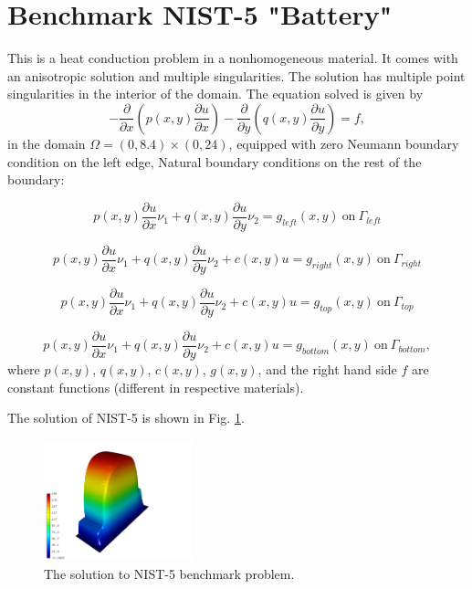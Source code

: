 \section{Benchmark NIST-5 "Battery"}
\label{sec:bench-5}

This is a heat conduction problem in a nonhomogeneous material. It comes with an anisotropic solution and
multiple singularities. The solution has multiple point singularities in the interior of the domain.
The equation solved is given by
\begin{equation} \label{heat-conduction}
-\frac{\partial }{\partial x}\left(p(x, y)\frac{\partial u}{\partial x}\right)
-\frac{\partial }{\partial y}\left(q(x, y)\frac{\partial u}{\partial y}\right) = f,
\end{equation}
in the domain $\Omega = (0, 8.4) \times (0, 24)$, equipped with zero Neumann boundary condition on the left edge, Natural boundary conditions on the rest of the boundary:

\begin{equation}
p(x, y)\frac{\partial u}{\partial x}\nu_1 + q(x, y)\frac{\partial u}{\partial y}\nu_2 = g_{left}(x, y) \ \mbox{on} \  \Gamma_{left}
\end{equation}

\begin{equation}
p(x, y)\frac{\partial u}{\partial x}\nu_1 + q(x, y)\frac{\partial u}{\partial y}\nu_2 + c(x, y)u = g_{right}(x, y) \ \mbox{on} \ \Gamma_{right}
\end{equation}

\begin{equation}
p(x, y)\frac{\partial u}{\partial x}\nu_1 + q(x, y)\frac{\partial u}{\partial y}\nu_2 + c(x, y)u = g_{top}(x, y) \ \mbox{on} \ \Gamma_{top}
\end{equation}

\begin{equation}
p(x, y)\frac{\partial u}{\partial x}\nu_1 + q(x, y)\frac{\partial u}{\partial y}\nu_2 + c(x, y)u = g_{bottom}(x, y) \ \mbox{on} \ \Gamma_{bottom},
\end{equation}
where $p(x, y)$, $q(x, y)$, $c(x, y)$, $g(x, y)$, and the right hand side $f$ are constant functions (different in respective materials).

The solution of NIST-5 is shown in Fig. \ref{fig:sln-nist05}.
\begin{figure}[!ht]
\centering
\includegraphics[height=35mm]{nist/nist-5/solution-3d.png}
\caption{The solution to NIST-5 benchmark problem.}
\label{fig:sln-nist05}
\end{figure}
